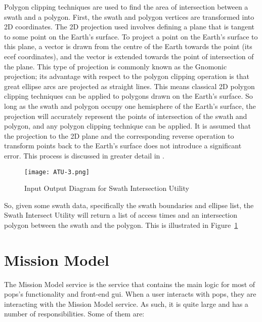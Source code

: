 Polygon clipping techniques are used to find the area of intersection between a
swath and a polygon. First, the swath and polygon vertices are transformed into
2D coordinates. The 2D projection used involves defining a plane that is
tangent to some point on the Earth’s surface.  To project a point on the
Earth’s surface to this plane, a vector is drawn from the centre of the Earth
towards the point (its \gls{ecef} coordinates), and the vector is extended
towards the point of intersection of the plane. This type of projection is
commonly known as the Gnomonic projection; its advantage with respect to the
polygon clipping operation is that great ellipse arcs are projected as straight
lines.  This means classical 2D polygon clipping techniques can be applied to
polygons drawn on the Earth’s surface. So long as the swath and polygon occupy
one hemisphere of the Earth’s surface, the projection will accurately represent
the points of intersection of the swath and polygon, and any polygon clipping
technique can be applied. It is assumed that the projection to the 2D plane and
the corresponding reverse operation to transform points back to the Earth's
surface does not introduce a significant error. This process is discussed in
greater detail in \cite{jagodzinski_geometric_2023}.


\begin{figure}[h]
    \centering
    \texttt{[image: ATU-3.png]} 
    \caption{Input Output Diagram for Swath Intersection Utility}
    \label{fig:atu-3} 
\end{figure}

So, given some swath data, specifically the swath boundaries and ellipse list,
the Swath Intersect Utility will return a list of access times and an
intersection polygon between the swath and the polygon. This is illustrated in
Figure~\ref{fig:atu-3}


\section{Mission Model}
 
The Mission Model service is the service that contains the main logic for most
of \gls{pops}'s functionality and front-end \gls{gui}. When a user interacts
with \gls{pops}, they are interacting with the Mission Model service. As such,
it is quite large and has a number of responsibilities. Some of them are:

